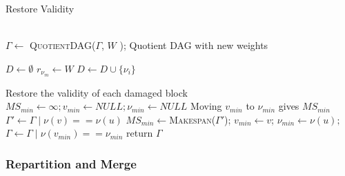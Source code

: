 \documentclass[sigconf,review,anonymous]{acmart}
\begin{document}
    \begin{algorithm}[h!]
        \caption{Restore Validity}
        \label{alg:RestoreValidity}
        \begin{algorithmic}[1]
            \\
            \State $\Gamma \gets $ \textsc{QuotientDAG}($\Gamma$, $W$ ); \Comment Quotient DAG with new weights

            \State $D \gets \emptyset$ 
                \State $r_{\nu_m} \gets W$
            \EndFor
                \label{line:damaged}
                    \State $D \gets D \cup \{\nu_i\}$
                \EndIf
            \EndFor

                \Comment Restore the validity of each damaged block
                    \State $MS_{min}\gets \infty; v_{min} \gets NULL; \nu_{min} \gets NULL$
                    \Comment Moving $v_{min}$ to $\nu_{min}$ gives $MS_{min}$
                           \label{line:neighb}
                        \State $\Gamma' \gets \Gamma \mid \nu(v) == \nu(u)$
                        \label{line:makespan}
                        \State $MS_{min} \gets $\textsc{Makespan}($\Gamma'$); $v_{min} \gets v$; $\nu_{min} \gets \nu(u);$
                        \EndIf
                        \EndFor
                    \EndFor
                    \State  $\Gamma \gets \Gamma \mid \nu(v_{min}) == \nu_{min}$ \label{line:movebest}
                \EndWhile
            \EndFor
            \State return $\Gamma$
            \EndProcedure
        \end{algorithmic}
    \end{algorithm}


    \subsubsection{Repartition and Merge}
\end{document}
